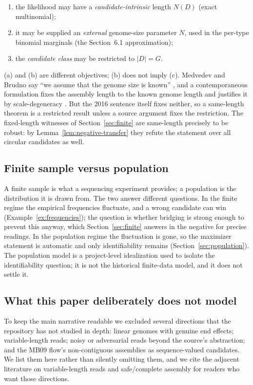 \begin{enumerate}[label=(\alph*),leftmargin=*]
  \item the likelihood may have a \emph{candidate-intrinsic} length $N(D)$
        (exact multinomial);
  \item it may be supplied an \emph{external} genome-size parameter $N$, used in
        the per-type binomial marginals (the Section~6.1 approximation);
  \item the \emph{candidate class} may be restricted to $|D|=G$.
\end{enumerate}
(a) and (b) are different objectives; (b) does not imply (c). Medvedev and
Brudno say ``we assume that the genome size is known''
\parencite[\S6.1]{medvedev2009}, and a contemporaneous formulation fixes the assembly
length to the known genome length and justifies it by scale-degeneracy
\parencite{ghodsi2016}. But the 2016 sentence itself fixes neither, so a same-length
theorem is a restricted result unless a source argument fixes the restriction.
The fixed-length witnesses of Section~\ref{sec:finite} are same-length precisely
to be robust: by Lemma~\ref{lem:negative-transfer} they refute the statement over
all circular candidates as well.

\subsection{Finite sample versus population}

A finite sample is what a sequencing experiment provides; a population is the
distribution it is drawn from. The two answer different questions. In the finite
regime the empirical frequencies fluctuate, and a wrong candidate can win
(Example~\ref{ex:frequencies}); the question is whether bridging is strong enough
to prevent this anyway, which Section~\ref{sec:finite} answers in the negative
for precise readings. In the population regime the fluctuation is gone, so the
maximizer statement is automatic and only identifiability remains
(Section~\ref{sec:population}). The population model is a project-level
idealization used to isolate the identifiability question; it is not the
historical finite-data model, and it does not settle it.

\subsection{What this paper deliberately does not model}

To keep the main narrative readable we excluded several directions that the
repository has not studied in depth: linear genomes with genuine end effects;
variable-length reads; noisy or adversarial reads beyond the source's
abstraction; and the MB09 flow's non-contiguous assemblies as
sequence-valued candidates. We list them here rather than silently omitting
them, and we cite the adjacent literature on variable-length reads
\parencite{hui2016} and safe/complete assembly \parencite{tomescu2016,rahman2022} for
readers who want those directions.

